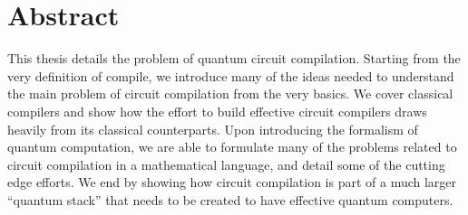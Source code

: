 
\begingroup
\let\clearpage\relax
\let\cleardoublepage\relax
\let\cleardoublepage\relax

\chapter*{Abstract}

This thesis details the problem of quantum circuit compilation.
Starting from the very definition of compile, we introduce many of the ideas needed to understand the main problem of circuit compilation from the very basics.
We cover classical compilers and show how the effort to build effective circuit compilers draws heavily from its classical counterparts.
Upon introducing the formalism of quantum computation, we are able to formulate many of the problems related to circuit compilation in a mathematical language, and detail some of the cutting edge efforts.
We end by showing how circuit compilation is part of a much larger ``quantum stack'' that needs to be created to have effective quantum computers.

\vfill

\endgroup

\vfill
